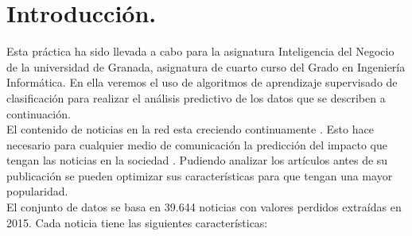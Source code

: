 	
	\maketitle %
	
	\newpage %
	
	\tableofcontents %
	
	\listoffigures %
	
	\listoftables %
	
	\newpage
	
	\section[Introducción]{Introducción.}

	Esta práctica ha sido llevada a cabo para la asignatura Inteligencia del Negocio de la universidad de Granada, asignatura de 
	cuarto curso del Grado en Ingeniería Informática. En ella veremos el uso de algoritmos de aprendizaje supervisado de clasificación
	para realizar el análisis predictivo de los datos que se describen a continuación. \\
	
	El contenido de noticias en la red esta	creciendo continuamente . Esto hace necesario para cualquier
	medio de comunicación la predicción del impacto que tengan las noticias en la sociedad . Pudiendo analizar los artículos antes
	de su publicación se pueden optimizar sus características para que tengan una mayor popularidad. \\
	
	El conjunto de datos \cite{sci2s.ugr.es} se basa en 39.644 noticias con valores perdidos extraídas en 2015. 
	Cada noticia tiene las siguientes características: \\
	
	\vspace{1mm}
	

